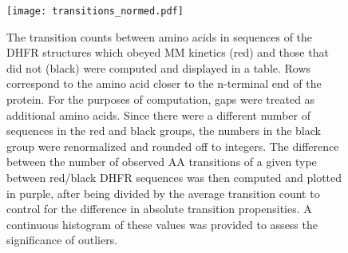 \documentclass[a4paper,11pt]{article}
\begin{document}
\begin{figure}
\centerline{\texttt{[image: transitions\_normed.pdf]}}
\caption[Amino Acid Transition Matrix with Normalized Differences]{The transition counts between amino acids in sequences of the DHFR structures which obeyed MM kinetics (red) and those that did not (black) were computed and displayed in a table. Rows correspond to the amino acid closer to the n-terminal end of the protein. For the purposes of computation, gaps were treated as additional amino acids. Since there were a different number of sequences in the red and black groups, the numbers in the black group were renormalized and rounded off to integers. The difference between the number of observed AA transitions of a given type between red/black DHFR sequences was then computed and plotted in purple, after being divided by the average transition count to control for the difference in absolute transition propensities. A continuous histogram of these values was provided to assess the significance of outliers.}
\end{figure}
\end{document}
